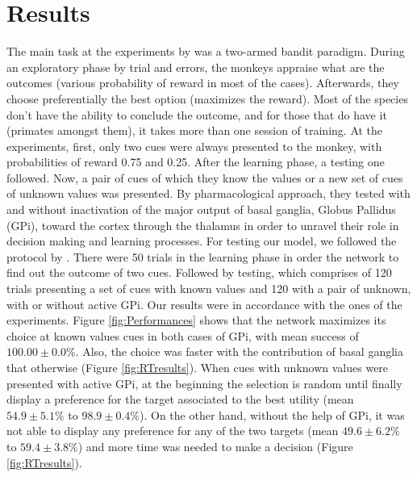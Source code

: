 \section{Results}

	The main task at the experiments by \citet{Piron2015} was a two-armed bandit paradigm. During an exploratory phase by trial and errors, the monkeys appraise what are the outcomes (various probability of reward in most of the cases). Afterwards, they choose preferentially the best option (maximizes the reward). Most of the species don't have the ability to conclude the outcome, and for those that do have it (primates amongst them), it takes more than one session of training. 
	At the experiments, first, only two cues were always presented to the monkey, with probabilities of reward 0.75 and 0.25. After the learning phase, a testing one followed. Now, a pair of cues of which they know the values or  a new set of cues of unknown values was presented. By pharmacological approach, they tested with and without inactivation of the major output of basal ganglia, Globus Pallidus (GPi), toward the cortex through the thalamus in order to unravel their role in decision making and learning processes.
	For testing our model, we followed the protocol by \citet{Piron2015}. There were 50 trials in the learning phase in order the network to find out the outcome of two cues. Followed by testing, which comprises of 120 trials presenting a set of cues with known values and 120 with a pair of unknown, with or without active GPi.
	Our results were in accordance with the ones of the experiments. Figure \ref{fig:Performances} shows that the network maximizes its choice at known values cues in both cases of GPi, with mean success of  $100.00\pm 0.0\%$. Also, the choice was faster with the contribution of basal ganglia that otherwise (Figure \ref{fig:RTresults}). When cues with unknown values were presented with active GPi, at the beginning the selection is random until finally display a preference for the target associated to the best utility (mean $54.9 \pm 5.1\%$ to $98.9 \pm 0.4\%$). On the other hand, without the help of GPi, it was not able to display any preference for any of the two targets (mean $49.6 \pm 6.2\%$ to  $59.4\pm 3.8\%$) and more time was needed to make a decision (Figure \ref{fig:RTresults}). 